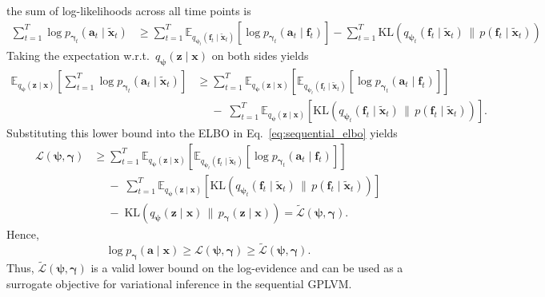 the sum of log-likelihoods across all time points is
\begin{align*}
\sum_{t=1}^T \log p_{\boldsymbol{\gamma}_t}(\mathbf{a}_t\mid \widetilde{\mathbf{x}}_{t})
&\ge \sum_{t=1}^T \mathbb{E}_{q_{\boldsymbol{\psi}_t}(\mathbf{f}_t\mid \widetilde{\mathbf{x}}_{t})}
\!\left[\log p_{\boldsymbol{\gamma}_t}(\mathbf{a}_t\mid \mathbf{f}_t)\right]
- \sum_{t=1}^T \mathrm{KL}\!\left(
q_{\boldsymbol{\psi}_t}(\mathbf{f}_t\mid \widetilde{\mathbf{x}}_{t})
\,\big\|\,
p(\mathbf{f}_t\mid \widetilde{\mathbf{x}}_{t})
\right)
\end{align*}
Taking the expectation w.r.t.\ 
\(q_{\boldsymbol{\psi}}(\mathbf{z}\mid \mathbf{x})\) on both sides yields
\begin{align*}
\mathbb{E}_{q_{\boldsymbol{\psi}}(\mathbf{z}\mid \mathbf{x})}\!\left[\sum_{t=1}^T \log p_{\boldsymbol{\gamma}_t}(\mathbf{a}_t\mid \widetilde{\mathbf{x}}_{t})\right]
&\ge \sum_{t=1}^T \mathbb{E}_{q_{\boldsymbol{\psi}}(\mathbf{z}\mid \mathbf{x})}\!
\left[
    \mathbb{E}_{q_{\boldsymbol{\psi}_t}(\mathbf{f}_t\mid \widetilde{\mathbf{x}}_{t})}
    \!\left[\log p_{\boldsymbol{\gamma}_t}(\mathbf{a}_t\mid \mathbf{f}_t)\right]
\right] \\
&\quad
\;-\; 
    \sum_{t=1}^T \mathbb{E}_{q_{\boldsymbol{\psi}}(\mathbf{z}\mid \mathbf{x})} 
    \left[
    \mathrm{KL}\!\left(
    q_{\boldsymbol{\psi}_t}(\mathbf{f}_t\mid \widetilde{\mathbf{x}}_{t})
    \,\big\|\,
    p(\mathbf{f}_t\mid \widetilde{\mathbf{x}}_{t})
    \right)
    \right].
\end{align*}
Substituting this lower bound into the ELBO in Eq.~\eqref{eq:sequential_elbo} yields
\begin{align}
\mathcal{L}(\boldsymbol{\psi},\boldsymbol{\gamma}) 
&\ge \sum_{t=1}^T \mathbb{E}_{q_{\boldsymbol{\psi}}(\mathbf{z}\mid \mathbf{x})}
\!\left[\mathbb{E}_{q_{\boldsymbol{\psi}_t}(\mathbf{f}_t\mid \widetilde{\mathbf{x}}_{t})}
\!\left[\log p_{\boldsymbol{\gamma}_t}(\mathbf{a}_t\mid \mathbf{f}_t)\right]\right]\nonumber\\
&\quad
\;-\;
\sum_{t=1}^T \mathbb{E}_{q_{\boldsymbol{\psi}}(\mathbf{z}\mid \mathbf{x})} 
    \left[
    \mathrm{KL}\!\left(
    q_{\boldsymbol{\psi}_t}(\mathbf{f}_t\mid \widetilde{\mathbf{x}}_{t})
    \,\big\|\,
    p(\mathbf{f}_t\mid \widetilde{\mathbf{x}}_{t})
    \right)
    \right] \nonumber\\ 
&\quad
\;-\; \mathrm{KL}\!\left(q_{\boldsymbol{\psi}}(\mathbf{z}\mid \mathbf{x})\,\|\,p_{\boldsymbol{\gamma}}(\mathbf{z}\mid \mathbf{x})\right) = \widetilde{\mathcal{L}}(\boldsymbol{\psi}, \boldsymbol{\gamma}).
\label{eq:new_lower_bound}
\end{align}
Hence, 
\begin{equation}
\log p_{\boldsymbol{\gamma}}(\mathbf{a}\mid \mathbf{x})\ge 
\mathcal{L}(\boldsymbol{\psi}, \boldsymbol{\gamma}) 
\ge \widetilde{\mathcal{L}}(\boldsymbol{\psi}, \boldsymbol{\gamma}).
\label{eq:final_lower_bound}
\end{equation}
Thus, \(\widetilde{\mathcal{L}}(\boldsymbol{\psi}, \boldsymbol{\gamma})\) 
is a valid lower bound on the log-evidence and can be used as a 
surrogate objective for variational inference in the sequential GPLVM.

